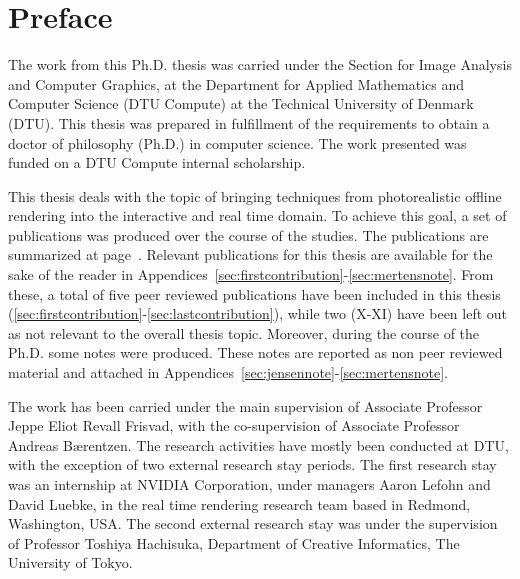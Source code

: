 \chapter{Preface}

The work from this Ph.D. thesis was carried under the Section for Image Analysis and Computer Graphics, at the Department for Applied Mathematics and Computer Science (DTU Compute) at the Technical University of Denmark (DTU). This thesis was prepared in fulfillment of the requirements to obtain a doctor of philosophy (Ph.D.) in computer science. The work presented was funded on a DTU Compute internal scholarship. 

This thesis deals with the topic of bringing techniques from photorealistic offline rendering into the interactive and real time domain. To achieve this goal, a set of publications was produced over the course of the studies. The publications are summarized at page~\pageref{sec:contributionlist}. Relevant  publications for this thesis are available for the sake of the reader in Appendices~\ref{sec:firstcontribution}-\ref{sec:mertensnote}. From these, a total of five peer reviewed publications have been included in this thesis (\ref{sec:firstcontribution}-\ref{sec:lastcontribution}), while two (X-XI) have been left out as not relevant to the overall thesis topic. Moreover, during the course of the Ph.D. some notes were produced. These notes are reported as non peer reviewed material and attached in Appendices~\ref{sec:jensennote}-\ref{sec:mertensnote}. 

The work has been carried under the main supervision of Associate Professor Jeppe Eliot Revall Frisvad, with the co-supervision of Associate Professor Andreas B\ae rentzen. The research activities have mostly been conducted at DTU, with the exception of two external research stay periods. The first research stay was an internship at NVIDIA Corporation, under managers Aaron Lefohn and David Luebke, in the real time rendering research team based in Redmond, Washington, USA. The second external research stay was under the supervision of Professor Toshiya Hachisuka, Department of Creative Informatics, The University of Tokyo.

